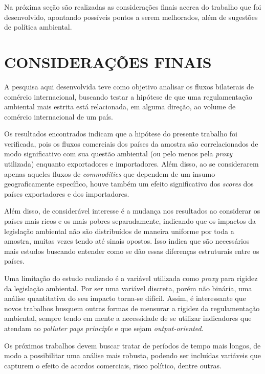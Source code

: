 \newpage

Na próxima seção são realizadas as considerações finais acerca do trabalho que foi desenvolvido, apontando possíveis pontos a serem melhorados, além de sugestões de política ambiental.

\section{CONSIDERAÇÕES FINAIS}

A pesquisa aqui desenvolvida teve como objetivo analisar os fluxos bilaterais de comércio internacional, buscando testar a hipótese de que uma regulamentação ambiental mais estrita está relacionada, em alguma direção, ao volume de comércio internacional de um país. 

Os resultados encontrados indicam que a hipótese do presente trabalho foi verificada, pois os fluxos comerciais dos países da amostra são correlacionados de modo significativo com sua questão ambiental (ou pelo menos pela \textit{proxy} utilizada) enquanto exportadores e importadores. Além disso, ao se considerarem apenas aqueles fluxos de \textit{commodities} que dependem de um insumo geograficamente específico, houve também um efeito significativo dos \textit{scores} dos países exportadores e dos importadores.

Além disso, de considerável interesse é a mudança nos resultados ao considerar os países mais ricos e os mais pobres separadamente, indicando que os impactos da legislação ambiental não são distribuídos de maneira uniforme por toda a amostra, muitas vezes tendo até sinais opostos. Isso indica que são necessários mais estudos buscando entender como se dão essas diferenças estruturais entre os países.


Uma limitação do estudo realizado é a variável utilizada como \textit{proxy} para rigidez da legislação ambiental. Por ser uma variável discreta, porém não binária, uma análise quantitativa do seu impacto torna-se difícil.  Assim, é interessante que novos trabalhos busquem outras formas de mensurar a rigidez da regulamentação ambiental, sempre tendo em mente a necessidade de se utilizar indicadores que atendam ao \textit{polluter pays principle} e que sejam \textit{output-oriented}.

Os próximos trabalhos devem buscar tratar de períodos de tempo mais longos, de modo a possibilitar uma análise mais robusta, podendo ser incluídas variáveis que capturem o efeito de acordos comerciais, risco político, dentre outras.

